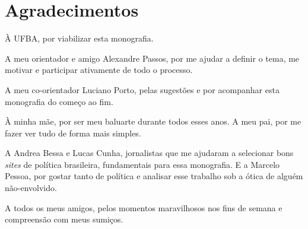 \chapter*{Agradecimentos}

À UFBA, por viabilizar esta monografia.

A meu orientador e amigo Alexandre Passos, por me ajudar a definir o tema, me motivar e participar ativamente de todo o processo.

A meu co-orientador Luciano Porto, pelas sugestões e por acompanhar esta monografia do começo ao fim.

À minha mãe, por ser meu baluarte durante todos esses anos. A meu pai, por me fazer ver tudo de forma mais simples.

A Andrea Bessa e Lucas Cunha, jornalistas que me ajudaram a selecionar bons \emph{sites} de política brasileira, fundamentais para essa monografia. E a Marcelo Pessoa, por gostar tanto de política e analisar esse trabalho sob a ótica de alguém não-envolvido.

A todos os meus amigos, pelos momentos maravilhosos nos fins de semana e compreensão com meus sumiços.


